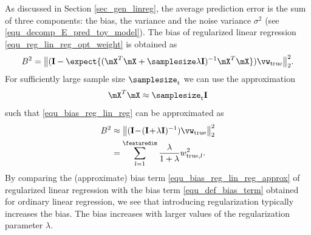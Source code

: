 \documentclass[12pt]{report}
\begin{document}
As discussed in Section \ref{sec_gen_linreg}, the average prediction error is the sum of three 
components: the bias, the variance and the noise variance $\sigma^{2}$ (see \eqref{equ_decomp_E_pred_toy_model}). 
The bias of regularized linear regression \eqref{equ_reg_lin_reg_opt_weight} is obtained as 
\begin{equation} 
\label{equ_bias_reg_lin_reg}
B^{2} = \big \| (\mathbf{I} - \expect \{ ( \mX^{T} \mX +  \samplesize \lambda \mathbf{I})^{-1} \mX^{T} \mX  \})  \vw_{\rm true} \big  \|^{2}_{2}. 
\end{equation} 
For sufficiently large sample size $\samplesize_{\rm t}$ we can use the approximation 
\begin{equation} 
\label{equ_approx_Gram_large_N}
\mX^{T} \mX  \approx \samplesize_{\rm t} \mathbf{I} 
\end{equation} 
such that \eqref{equ_bias_reg_lin_reg} can be approximated as 
 \begin{align} 
\label{equ_bias_reg_lin_reg_approx}
B^{2} & \approx \big \| (\mathbf{I}\!-\!(\mathbf{I}\!+\!\lambda \mathbf{I})^{-1} ) \vw_{\rm true} \big  \|^{2}_{2} \nonumber \\
& =  \sum_{l=1}^{\featuredim} \frac{\lambda}{1+\lambda} w_{{\rm true},l}^2 .
\end{align} 
By comparing the (approximate) bias term \eqref{equ_bias_reg_lin_reg_approx} of regularized linear regression 
with the bias term \eqref{equ_def_bias_term} obtained for ordinary linear regression, we see that introducing 
regularization typically increases the bias. The bias increases with larger values of the regularization parameter $\lambda$. 
\end{document}
